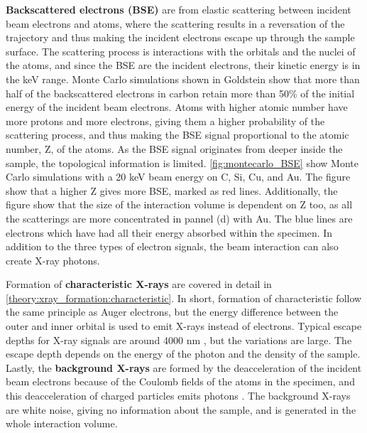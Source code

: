 \textbf{Backscattered electrons (BSE)} are from elastic scattering between incident beam electrons and atoms, where the scattering results in a reversation of the trajectory and thus making the incident electrons escape up through the sample surface.
The scattering process is interactions with the orbitals and the nuclei of the atoms, and since the BSE are the incident electrons, their kinetic energy is in the keV range.
Monte Carlo simulations shown in Goldstein \cite[Fig. 2.16 b]{goldstein_scanning_2018} show that more than half of the backscattered electrons in carbon retain more than 50\% of the initial energy of the incident beam electrons.
Atoms with higher atomic number have more protons and more electrons, giving them a higher probability of the scattering process, and thus making the BSE signal proportional to the atomic number, Z, of the atoms.
As the BSE signal originates from deeper inside the sample, the topological information is limited.
\cref{fig:montecarlo_BSE} show Monte Carlo simulations with a 20 keV beam energy on C, Si, Cu, and Au.
The figure show that a higher Z gives more BSE, marked as red lines.
Additionally, the figure show that the size of the interaction volume is dependent on Z too, as all the scatterings are more concentrated in pannel (d) with Au.
The blue lines are electrons which have had all their energy absorbed within the specimen.
In addition to the three types of electron signals, the beam interaction can also create X-ray photons.


Formation of \textbf{characteristic X-rays} are covered in detail in \cref{theory:xray_formation:characteristic}.
In short, formation of characteristic follow the same principle as Auger electrons, but the energy difference between the outer and inner orbital is used to emit X-rays instead of electrons.
Typical escape depths for X-ray signals are around 4000 nm \cite{hollas_modern_2004}, but the variations are large.
The escape depth depends on the energy of the photon and the density of the sample.
Lastly, the \textbf{background X-rays} are formed by the deacceleration of the incident beam electrons because of the Coulomb fields of the atoms in the specimen, and this deacceleration of charged particles emits photons \cite{notaros_electromagnetics_2010}.
The background X-rays are white noise, giving no information about the sample, and is generated in the whole interaction volume.



